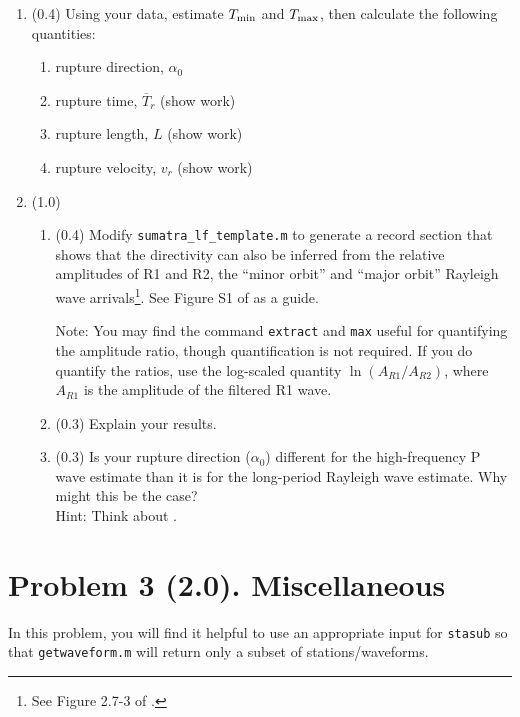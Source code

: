 \documentclass[11pt,titlepage,fleqn]{article}
\begin{document}
\begin{enumerate}

\item (0.4) Using your data, estimate $T_{\rm min}$ and $T_{\rm max}$, then calculate the following quantities:
%
\begin{enumerate}
\item rupture direction, $\alpha_0$
\item rupture time, $\overline{T}_r$ (show work)
\item rupture length, $L$ (show work)
\item rupture velocity, $v_r$ (show work)
\end{enumerate}


\item (1.0)
%
\begin{enumerate}
\item (0.4) Modify \verb+sumatra_lf_template.m+ to generate a record section that shows that the directivity can also be inferred from the relative amplitudes of R1 and R2, the ``minor orbit'' and ``major orbit'' Rayleigh wave arrivals\footnote{See Figure 2.7-3 of \citet{SteinWysession}.}. See Figure S1 of \citet{Ammon2005} as a guide.

Note: You may find the command \verb+extract+ and \verb+max+ useful for quantifying the amplitude ratio, though quantification is not required. If you do quantify the ratios, use the log-scaled quantity $\ln(A_{R1}/A_{R2})$, where $A_{R1}$ is the amplitude of the filtered R1 wave.

\item (0.3) Explain your results.

\item (0.3) Is your rupture direction ($\alpha_0$) different for the high-frequency P wave estimate than it is for the long-period Rayleigh wave estimate. Why might this be the case? \\
Hint: Think about .
\end{enumerate}

\end{enumerate}


\pagebreak
\section*{Problem 3 (2.0). Miscellaneous}

In this problem, you will find it helpful to use an appropriate input for \verb+stasub+ so that \verb+getwaveform.m+ will return only a subset of stations/waveforms.
\end{document}
